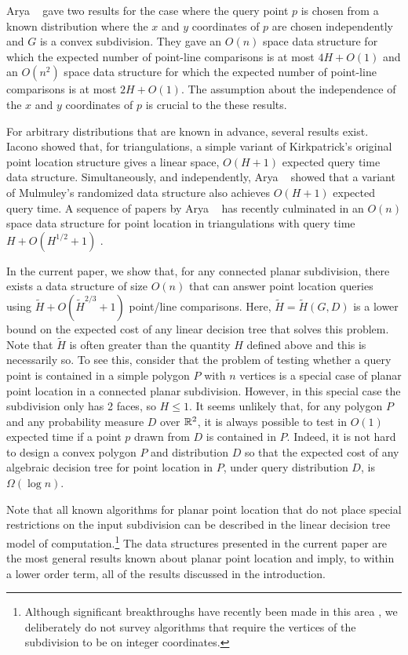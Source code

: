 \documentclass[lotsofwhite]{patmorin}
\begin{document}
Arya \etal\ \cite{acmr00} gave two results for the case where the
query point $p$ is chosen from a known distribution where the $x$ and
$y$ coordinates of $p$ are chosen independently and $G$ is a convex
subdivision.  They gave an $O(n)$ space data structure for which the
expected number of point-line comparisons is at most $4H+O(1)$ and an
$O(n^2)$ space data structure for which the expected number of
point-line comparisons is at most $2H+O(1)$.  The assumption about the
independence of the $x$ and $y$ coordinates of $p$ is crucial to the
these results.

For arbitrary distributions that are known in advance, several results
exist.  Iacono \cite{i01,i04} showed that, for triangulations, a
simple variant of Kirkpatrick's original point location structure
gives a linear space, $O(H+1)$ expected query time data structure.
Simultaneously, and independently, Arya \etal\ \cite{amm01b} showed
that a variant of Mulmuley's randomized data structure also achieves
$O(H+1)$ expected query time.  A sequence of papers by Arya \etal\
\cite{amm00,amm01a,ammw07} has recently culminated in an $O(n)$ space
data structure for point location in triangulations with query time
$H+O(H^{1/2} + 1)$ \cite{ammw07}.

In the current paper, we show that, for any connected planar
subdivision, there exists a data structure of size $O(n)$ that can
answer point location queries using $\tilde H + O(\tilde H^{2/3}+1)$
point/line comparisons.  Here, $\tilde H=\tilde H(G,D)$ is a lower
bound on the expected cost of any linear decision tree that solves
this problem.  Note that $\tilde H$ is often greater than the quantity
$H$ defined above and this is necessarily so.  To see this, consider
that the problem of testing whether a query point is contained in a
simple polygon $P$ with $n$ vertices is a special case of planar point
location in a connected planar subdivision.  However, in this special
case the subdivision only has 2 faces, so $H\le 1$.  It seems unlikely
that, for any polygon $P$ and any probability measure $D$ over $\mathbb{R}^2$,
it is always possible to test in $O(1)$ expected time if a point
$p$ drawn from $D$ is contained in $P$.  Indeed, it is not hard to
design a convex polygon $P$ and distribution $D$ so that the expected
cost of any algebraic decision tree for point location in $P$, under
query distribution $D$, is $\Omega(\log n)$.

Note that all known algorithms for planar point location that do not
place special restrictions on the input subdivision can be described
in the linear decision tree model of computation.\footnote{Although
significant breakthroughs have recently been made in this area
\cite{c06,p06}, we deliberately do not survey algorithms that require
the vertices of the subdivision to be on integer coordinates.}  The
data structures presented in the current paper are the most general
results known about planar point location and imply, to within a
lower order term, all of the results discussed in the introduction.
\end{document}
